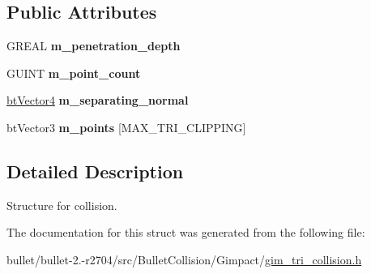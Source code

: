 \subsection*{Public Attributes}
\begin{DoxyCompactItemize}
\item 
\hypertarget{struct_g_i_m___t_r_i_a_n_g_l_e___c_o_n_t_a_c_t___d_a_t_a_a42268781ae742b60561e8af4297284e1}{G\+R\+E\+A\+L {\bfseries m\+\_\+penetration\+\_\+depth}}\label{struct_g_i_m___t_r_i_a_n_g_l_e___c_o_n_t_a_c_t___d_a_t_a_a42268781ae742b60561e8af4297284e1}

\item 
\hypertarget{struct_g_i_m___t_r_i_a_n_g_l_e___c_o_n_t_a_c_t___d_a_t_a_a60e062bd749b9ce60ad87ae5c577aa49}{G\+U\+I\+N\+T {\bfseries m\+\_\+point\+\_\+count}}\label{struct_g_i_m___t_r_i_a_n_g_l_e___c_o_n_t_a_c_t___d_a_t_a_a60e062bd749b9ce60ad87ae5c577aa49}

\item 
\hypertarget{struct_g_i_m___t_r_i_a_n_g_l_e___c_o_n_t_a_c_t___d_a_t_a_af060d0dbffcd1be4c3afe488efbd4df5}{\hyperlink{classbt_vector4}{bt\+Vector4} {\bfseries m\+\_\+separating\+\_\+normal}}\label{struct_g_i_m___t_r_i_a_n_g_l_e___c_o_n_t_a_c_t___d_a_t_a_af060d0dbffcd1be4c3afe488efbd4df5}

\item 
\hypertarget{struct_g_i_m___t_r_i_a_n_g_l_e___c_o_n_t_a_c_t___d_a_t_a_a3e5254b44288a281100decddecc69055}{bt\+Vector3 {\bfseries m\+\_\+points} \mbox{[}M\+A\+X\+\_\+\+T\+R\+I\+\_\+\+C\+L\+I\+P\+P\+I\+N\+G\mbox{]}}\label{struct_g_i_m___t_r_i_a_n_g_l_e___c_o_n_t_a_c_t___d_a_t_a_a3e5254b44288a281100decddecc69055}

\end{DoxyCompactItemize}


\subsection{Detailed Description}
Structure for collision. 

The documentation for this struct was generated from the following file\+:\begin{DoxyCompactItemize}
\item 
bullet/bullet-\/2.-\/r2704/src/\+Bullet\+Collision/\+Gimpact/\hyperlink{gim__tri__collision_8h}{gim\+\_\+tri\+\_\+collision.\+h}\end{DoxyCompactItemize}
